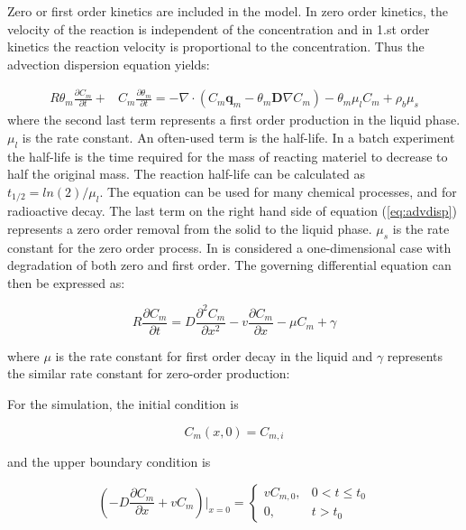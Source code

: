 \documentclass{report}
\begin{document}
Zero or first order kinetics are included in the model. In zero order
kinetics, the velocity of the reaction is
independent of the concentration and in 1.st order
kinetics the reaction velocity is
proportional to the concentration. Thus the advection dispersion
equation yields:

\begin{equation}
\begin{split}
 R\theta_{m} \frac{\partial C_{m}}{\partial t} +& C_{m} \frac{\partial
  \theta_{m}}{\partial t} =  -\nabla \cdot(C_{m}
  \mathbf{q}_{m}-\theta_{m} \mathbf{D}\nabla C_{m})- \theta_{m} \mu_l C_{m} +
  \rho_b \mu_s
\label{eq:advdisp}
\end{split}
\end{equation}
%
where the second last term represents a first order production in
the liquid phase.  $\mu_l$ is the rate constant. An often-used term
is the half-life. In a batch experiment
the half-life is the time required for the mass of reacting materiel to
decrease to half the original mass. The reaction half-life can be
calculated as $t_{1/2}=ln(2)/\mu_l$. The equation can be used for
many chemical processes, and for radioactive
decay. The last term on the right hand
side of equation (\ref{eq:advdisp}) represents a zero order
removal from the solid to the liquid phase. $\mu_s$ is the rate
constant for the zero order process. In \cite{Genuchtenanalytical}
is considered a one-dimensional case with degradation of both zero
and first order. The governing differential equation can then be
expressed as:

\begin{equation}
R\frac{\partial C_m}{\partial t}=D\frac{\partial^2C_m}{\partial
  x^2}-v\frac{\partial C_m}{\partial x}-\mu C_m +\gamma
\end{equation}

where $\mu$ is the rate constant for first order decay in the liquid
and $\gamma$ represents the similar rate constant for zero-order
production:

For the simulation, the initial condition is

\begin{equation}
C_m(x,0)=C_{m,i}
\end{equation}

and the upper boundary condition is

\begin{equation}
\left(-D\frac{\partial C_m}{\partial x}+vC_m\right)\bigg\vert_{x=0}=\begin{cases} vC_{m,0}, &
  0<t\leq t_0 \\ 0, & t>t_0 \end{cases}
\end{equation}
\end{document}

